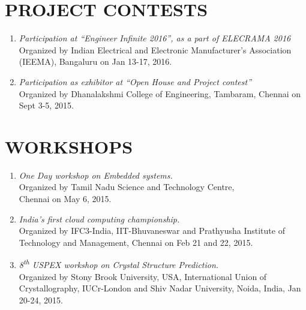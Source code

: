 \documentclass[line,margin,12pt ]{res}
\begin{document}
\begin{resume}
\section{PROJECT CONTESTS}\vspace*{-0.48 cm} %
\begin{enumerate}
\item {\sl Participation at \textquotedblleft Engineer Infinite 2016\textquotedblright, as a part of ELECRAMA 2016} 
\\Organized by Indian Electrical and Electronic Manufacturer's Association (IEEMA), Bangaluru on Jan 13-17, 2016.
\item {\sl Participation as exhibitor at \textquotedblleft Open House and Project contest\textquotedblright}
\\Organized by Dhanalakshmi College of Engineering, Tambaram, Chennai on Sept 3-5, 2015.
\end{enumerate}


\section{WORKSHOPS}\vspace*{-0.48 cm}
\begin{enumerate}
\item {\sl One Day workshop on Embedded systems.}
\\Organized by Tamil Nadu Science and Technology Centre, \\Chennai on May 6, 2015.
\item {\sl India's first cloud computing championship.} 
\\Organized by IFC3-India, IIT-Bhuvaneswar and Prathyusha Institute of Technology and Management, Chennai on Feb 21 and 22, 2015. 
\item {\sl 8\textsuperscript{th} USPEX workshop on Crystal Structure Prediction.} 
\\Organized by Stony Brook University, USA, International Union of \\Crystallography, IUCr-London and Shiv Nadar University, Noida, India, Jan 20-24, 2015.
\end{enumerate}        



\end{resume}
\end{document}
